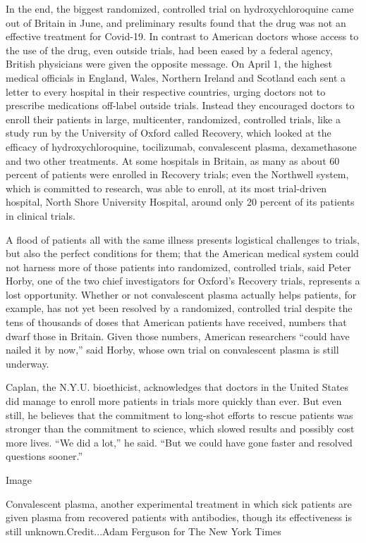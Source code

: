 In the end, the biggest randomized, controlled trial on
hydroxychloroquine came out of Britain in June, and preliminary results
found that the drug was not an effective treatment for Covid-19. In
contrast to American doctors whose access to the use of the drug, even
outside trials, had been eased by a federal agency, British physicians
were given the opposite message. On April 1, the highest medical
officials in England, Wales, Northern Ireland and Scotland each sent a
letter to every hospital in their respective countries, urging doctors
not to prescribe medications off-label outside trials. Instead they
encouraged doctors to enroll their patients in large, multicenter,
randomized, controlled trials, like a study run by the University of
Oxford called Recovery, which looked at the efficacy of
hydroxychloroquine, tocilizumab, convalescent plasma, dexamethasone and
two other treatments. At some hospitals in Britain, as many as about 60
percent of patients were enrolled in Recovery trials; even the Northwell
system, which is committed to research, was able to enroll, at its most
trial-driven hospital, North Shore University Hospital, around only 20
percent of its patients in clinical trials.

A flood of patients all with the same illness presents logistical
challenges to trials, but also the perfect conditions for them; that the
American medical system could not harness more of those patients into
randomized, controlled trials, said Peter Horby, one of the two chief
investigators for Oxford's Recovery trials, represents a lost
opportunity. Whether or not convalescent plasma actually helps patients,
for example, has not yet been resolved by a randomized, controlled trial
despite the tens of thousands of doses that American patients have
received, numbers that dwarf those in Britain. Given those numbers,
American researchers ``could have nailed it by now,'' said Horby, whose
own trial on convalescent plasma is still underway.

Caplan, the N.Y.U. bioethicist, acknowledges that doctors in the United
States did manage to enroll more patients in trials more quickly than
ever. But even still, he believes that the commitment to long-shot
efforts to rescue patients was stronger than the commitment to science,
which slowed results and possibly cost more lives. ``We did a lot,'' he
said. ``But we could have gone faster and resolved questions sooner.''

Image

Convalescent plasma, another experimental treatment in which sick
patients are given plasma from recovered patients with antibodies,
though its effectiveness is still unknown.Credit...Adam Ferguson for The
New York Times

